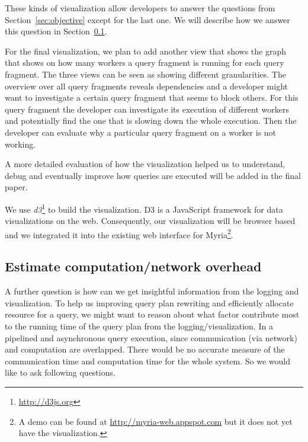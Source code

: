 \documentclass[11pt]{scrartcl}
\begin{document}
These kinds of visualization allow developers to answer the questions from Section~\ref{sec:objective} except for the last one. We will describe how we answer this question in Section~\ref{sec:overhead}.

For the final visualization, we plan to add another view that shows the graph that shows on how many workers a query fragment is running for each query fragment. The three views can be seen as showing different granularities. The overview over all query fragments reveals dependencies and a developer might want to investigate a certain query fragment that seems to block others. For this query fragment the developer can investigate its execution of different workers and potentially find the one that is slowing down the whole execution. Then the developer can evaluate why a particular query fragment on a worker is not working.

A more detailed evaluation of how the visualization helped us to understand, debug and eventually improve how queries are executed will be added in the final paper.

We use \emph{d3}\footnote{\url{http://d3js.org}} to build the visualization. D3 is a JavaScript framework for data visualizations on the web. Consequently, our visualization will be browser based and we integrated it into the existing web interface for Myria\footnote{A demo can be found at \url{http://myria-web.appspot.com} but it does not yet have the visualization.}.

\subsection{Estimate computation/network overhead}
\label{sec:overhead}

A further question is  how can we get insightful information from the logging and visualization. To help us improving query plan rewriting and efficiently allocate resource for a query, we might want to reason about what factor contribute most to the running time of the query plan from the logging/visualization. In a pipelined and asynchronous query execution, since communication (via network) and computation are overlapped. There would be no accurate measure of the communication time and computation time for the whole system.  So we would like to ask following questions.
\end{document}
